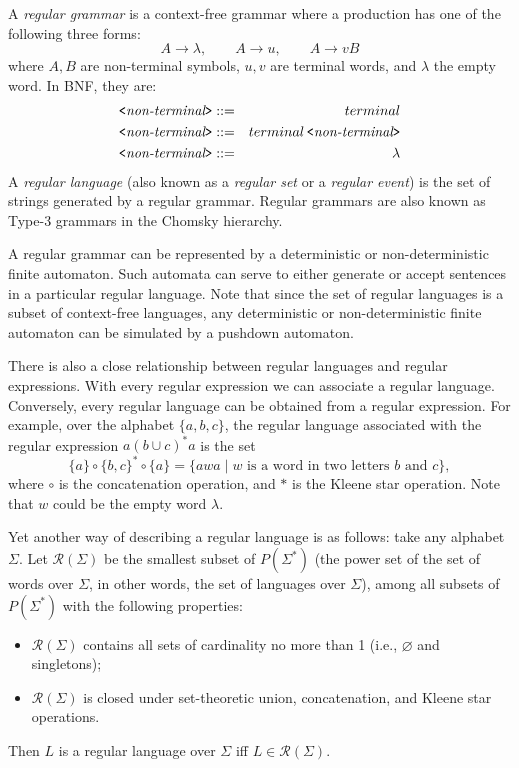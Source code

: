\documentclass[12pt]{article}
\begin{document}
A \emph{regular grammar} is a context-free grammar where a production has one of the following three forms:
$$A\to \lambda,\qquad A\to u, \qquad A\to vB$$
where $A,B$ are non-terminal symbols, $u,v$ are terminal words, and $\lambda$ the empty word.  In BNF, they are:
\begin{eqnarray*}
\verb.<.\textit{non-terminal}\verb.>. & ::= & terminal \\
\verb.<.\textit{non-terminal}\verb.>. & ::= & terminal\,\verb.<.\textit{non-terminal}\verb.>. \\
\verb.<.\textit{non-terminal}\verb.>. & ::= & \lambda
\end{eqnarray*}
A \emph{regular language} (also known as a \emph{regular set} or a \emph{regular event}) is the set of strings generated by a regular grammar.
Regular grammars are also known as Type-3 grammars in the Chomsky hierarchy.

A regular grammar can be represented by a deterministic or non-deterministic finite automaton.  Such automata can serve to either generate or accept sentences in a particular regular language.  Note that since the set of regular languages is a subset of context-free languages, any deterministic or non-deterministic finite automaton can be simulated by a pushdown automaton.

There is also a close relationship between regular languages and regular expressions.  With every regular expression we can associate a regular language.  Conversely, every regular language can be obtained from a regular expression.  For example, over the alphabet $\lbrace a,b,c\rbrace$, the regular language associated with the regular expression $a(b\cup c)^*a$ is the set $$\lbrace a\rbrace \circ \lbrace b,c\rbrace^* \circ \lbrace a\rbrace=\lbrace awa\mid w\mbox{ is a word in two letters }b\mbox{ and }c\rbrace,$$ where $\circ$ is the concatenation operation, and $*$ is the Kleene star operation.  Note that $w$ could be the empty word $\lambda$.

Yet another way of describing a regular language is as follows: take any alphabet $\Sigma$.  Let $\mathcal{R}(\Sigma)$ be the smallest subset of $P(\Sigma^*)$ (the power set of the set of words over $\Sigma$, in other words, the set of languages over $\Sigma$), among all subsets of $P(\Sigma^*)$ with the following properties:
\begin{itemize}
\item $\mathcal{R}(\Sigma)$ contains all sets of cardinality no more than 1 (i.e., $\varnothing$ and singletons);
\item $\mathcal{R}(\Sigma)$ is closed under set-theoretic union, concatenation, and Kleene star operations.  
\end{itemize}
Then $L$ is a regular language over $\Sigma$ iff $L\in \mathcal{R}(\Sigma)$.
\end{document}
